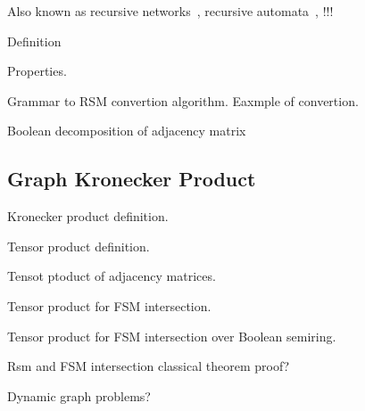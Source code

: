 Also known as recursive networks~\cite{!!!}, recursive automata~\cite{!!!}, !!!  

Definition

Properties.

Grammar to RSM convertion algorithm.
Eaxmple of convertion.

Boolean decomposition of adjacency matrix

\subsection{Graph Kronecker Product}

Kronecker product definition.

Tensor product definition.

Tensot ptoduct of adjacency matrices.

Tensor product for FSM intersection.

Tensor product for FSM intersection over Boolean semiring.

Rsm and FSM intersection classical theorem proof?

Dynamic graph problems? 